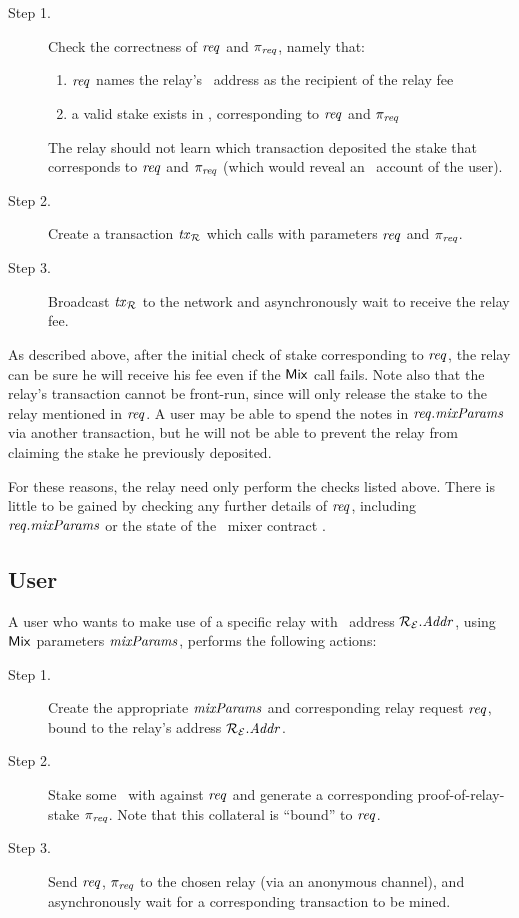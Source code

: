 \begin{description}
\item [Step 1.] Check the correctness of $\mathit{req}$ and $\pi_{\mathtt{\mathit{req}}}$, namely that:
  \begin{enumerate}
    \item $\mathit{req}$ names the relay's \ethereum~address as the recipient of the relay fee
    \item a valid stake exists in \stakecontract{}, corresponding to $\mathit{req}$ and $\pi_{\mathtt{\mathit{req}}}$
  \end{enumerate}
  The relay should not learn which transaction deposited the stake that corresponds to $\mathit{req}$ and $\pi_{\mathtt{\mathit{req}}}$ (which would reveal an \ethereum~account of the user).
\item [Step 2.] Create a transaction $\mathit{tx}_{\mathcal{R}}$ which calls \stakecontract{} with parameters $\mathit{req}$ and $\pi_{\mathtt{\mathit{req}}}$.
\item [Step 3.] Broadcast $\mathit{tx}_{\mathcal{R}}$ to the network and asynchronously wait to receive the relay fee.
\end{description}

As described above, after the initial check of stake corresponding to $\mathit{req}$, the relay can be sure he will receive his fee even if the $\mathsf{Mix}$ call fails. Note also that the relay's transaction cannot be front-run, since \stakecontract{} will only release the stake to the relay mentioned in $\mathit{req}$. A user may be able to spend the notes in $\mathit{req}.\mathit{mixParams}$ via another transaction, but he will not be able to prevent the relay from claiming the stake he previously deposited.

For these reasons, the relay need only perform the checks listed above. There is little to be gained by checking any further details of $\mathit{req}$, including $\mathit{req}.\mathit{mixParams}$ or the state of the \zeth~mixer contract \mixer{}.

\subsection{User}

A user who wants to make use of a specific relay \relayP{} with \ethereum~address $\mathcal{{R}_{E}}.\mathit{Addr}$, using $\mathsf{Mix}{}$ parameters $\mathit{mixParams}$, performs the following actions:
\begin{description}
\item [Step 1.] Create the appropriate $\mathit{mixParams}$ and corresponding relay request $\mathit{req}$, bound to the relay's address $\mathcal{{R}_{E}}.\mathit{Addr}$.
\item [Step 2.] Stake some \ether~with \stakecontract{} against $\mathit{req}$ and generate a corresponding proof-of-relay-stake $\pi_{\mathtt{\mathit{req}}}$. Note that this collateral is ``bound'' to $\mathit{req}$.
\item [Step 3.] Send $\mathit{req}$, $\pi_{\mathtt{\mathit{req}}}$ to the chosen relay (via an anonymous channel), and asynchronously wait for a corresponding transaction to be mined.
\end{description}

